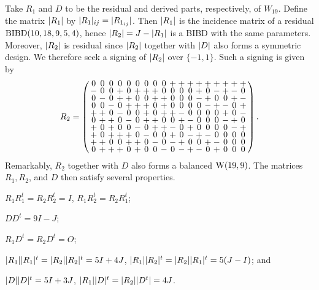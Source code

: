\documentclass[../../../main]{subfiles}
\begin{document}
 Take $R_1$ and $D$ to be the residual and derived parts, respectively, of
 $W_{19}$. Define the matrix $|R_1|$ by $|R_1|_{ij}=|R_{1_{ij}}|$.
 Then $|R_1|$ is the incidence matrix of a residual $\text{BIBD}(10,18,9,5,4)$,
 hence $|R_2|=J-|R_1|$ is a BIBD with the same parameters. Moreover,
 $|R_2|$ is residual since $|R_2|$ together with $|D|$ also forms a
 symmetric design. We therefore seek a signing of $|R_2|$ over $\{-1,1\}$.
 Such a signing is given by
\[
  R_2=
  \arraycolsep=1.25pt\def\arraystretch{0.625}
  \left(\begin{array}{cccccccccccccccccc}
          0&0&0&0&0&0&0&0&0&+&+&+&+&+&+&+&+&+\\
          -&0&0&+&0&+&+&+&0&0&0&0&+&0&-&+&-&0\\
          0&-&0&+&+&0&0&+&+&0&0&0&-&+&0&0&+&-\\
          0&0&-&0&+&+&+&0&+&0&0&0&0&-&+&-&0&+\\
          +&+&0&-&0&0&+&0&+&+&-&0&0&0&0&+&0&-\\
          0&+&+&0&-&0&+&+&0&0&+&-&0&0&0&-&+&0\\
          +&0&+&0&0&-&0&+&+&-&0&+&0&0&0&0&-&+\\
          +&0&+&+&+&0&-&0&0&+&0&-&+&-&0&0&0&0\\
          +&+&0&0&+&+&0&-&0&-&+&0&0&+&-&0&0&0\\
          0&+&+&+&0&+&0&0&-&0&-&+&-&0&+&0&0&0\\
        \end{array}\right).
    \]
 Remarkably, $R_2$ together with $D$ also forms a balanced $\text{W}(19,9)$. The matrices $R_1,R_2$, and $D$ then satisfy several properties.
 
 \begin{lem}\label{base-bw-lem}
  \begin{defenum}
   \item[]
   \item\label{base-bw-lem-1} $R_1R_1^t=R_2R_2^t=I$, $R_1R_2^t=R_2R_1^t$;
   \item\label{base-bw-lem-2} $DD^t=9I-J$;
   \item\label{base-bw-lem-3} $R_1D^t=R_2D^t=O$;
   \item\label{base-bw-lem-4} $|R_1||R_1|^t=|R_2||R_2|^t=5I+4J$, $|R_1||R_2|^t=|R_2||R_1|^t=5(J-I)$; and
   \item\label{base-bw-lem-5} $|D||D|^t=5I+3J$, $|R_1||D|^t=|R_2||D^t|=4J$.
  \end{defenum}
 \end{lem}
 
\end{document}
